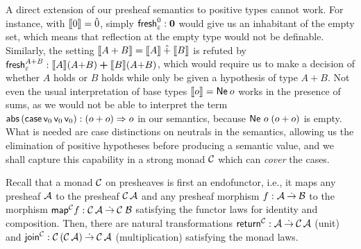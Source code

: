 \documentclass[sigplan,screen,fleqn,review]{acmart} %
\begin{document}
A direct extension of our presheaf semantics to positive types cannot
work.  For instance, with $\den \tyzero = \hat0$, simply
$\tfresh^{\tyzero}_{\cempty} : \bzero$
would give us an
inhabitant of the empty set, which means that reflection at the empty
type would not be definable.  Similarly, the setting
$\den{A + B} = \den A \hatplus \den B$ is refuted by
$\tfresh^{A + B}_{\cempty} : \den A (A{+}B) \bplus \den B (A{+}B)$,
which would require us to make a decision of whether $A$ holds or $B$ holds
while only be given a hypothesis of type $A + B$.
Not even the usual interpretation of base types $\den o = \tNe\,o$
works in the presence of sums, as we would not be able to interpret
the term
$\tabs\,(\tcase\,\vv0\,\vv0\,\vv0) :
(o+o) \To o$ in our semantics, because $\Ne o (o+o)$ is empty.
What is needed are case distinctions on neutrals in the semantics,
allowing us the elimination of positive hypotheses before producing a
semantic value,
and we shall capture this capability in a strong monad $\C$
which can \emph{cover} the cases.

Recall that a monad $\C$ on presheaves is first an endofunctor,
i.e., it maps any presheaf $\A$ to the presheaf $\C\,\A$ and any
presheaf morphism $f : \A \todot \B$ to the morphism
$\tmap[\C]f: \C\,\A \todot \C\;\B$ satisfying the functor laws for
identity and composition.  Then, there are natural transformations
$\treturn[\C] : \A \todot \C\,\A$ (unit) and
$\tjoin[\C] : \C\,(\C\,\A) \todot \C\,\A$ (multiplication)
satisfying
the monad laws.
\end{document}

